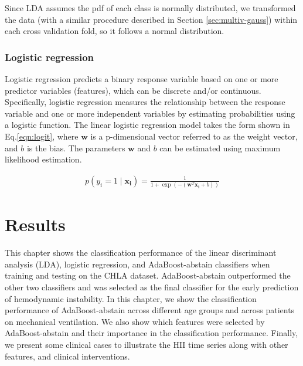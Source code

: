 \documentclass[
   technote
]{phildoc}
\newcommand{\hii}{HII}
\newcommand{\eq}{Eq.}
\begin{document}
Since LDA assumes the pdf of each class is normally distributed, we transformed the data (with a similar procedure described in Section \ref{sec:multiv-gauss}) within each cross validation fold, so it follows a normal distribution.  

\subsection{Logistic regression}
\label{sec:logreg}
Logistic regression predicts a binary response variable based on one or more predictor variables (features), which can be discrete and/or continuous. Specifically, logistic regression measures the relationship between the response variable and one or more independent variables by estimating probabilities using a logistic function. The linear logistic regression model takes the form shown in \eq{}\ref{eqn:logit}, where $\bm{w}$ is a p-dimensional vector referred to as the weight vector, and $b$ is the bias. The parameters $\bm{w}$ and $b$ can be estimated using maximum likelihood estimation.
   
\begin{eqnarray}
p(y_{i}=1 \mid \bm{x_{i}})=\frac{1}{1+\exp\left(-\left(\bm{w}^{T}\bm{x_{i}}+b\right)\right)} \label{eqn:logit}
\end{eqnarray}


\chapter{Results}
\label{results}

This chapter shows the classification performance of the linear discriminant analysis (LDA), logistic regression, and AdaBoost-abstain classifiers when training and testing on the CHLA dataset. AdaBoost-abstain outperformed the other two classifiers and was selected as the final classifier for the early prediction of hemodynamic instability. In this chapter, we show the classification performance of AdaBoost-abstain across different age groups and across patients on mechanical ventilation. We also show which features were selected by AdaBoost-abstain and their importance in the classification performance. Finally, we present some clinical cases to illustrate the \hii{} time series along with other features, and clinical interventions.    
\end{document}
